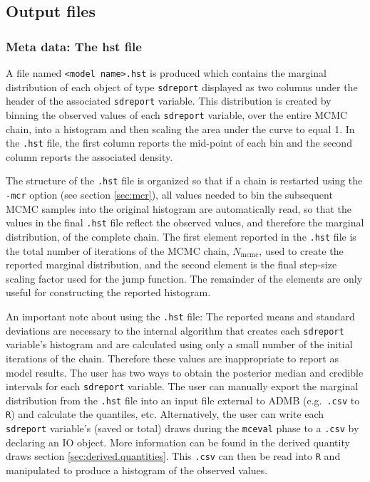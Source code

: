 \documentclass{article}\usepackage[]{graphicx}\usepackage[]{color}
\begin{document}
\subsection{Output files}\label{sec:outfiles}
\subsubsection{Meta data: The hst file}
A file named \texttt{<model name>.hst} is produced which
contains the marginal distribution of each object of type
\texttt{sdreport} displayed as two columns under the header
of the associated \texttt{sdreport} variable.  This
distribution is created by binning the observed values of
each \texttt{sdreport} variable, over the entire MCMC chain,
into a histogram and then scaling the area under the curve
to equal 1. In the \texttt{.hst} file, the first column
reports the mid-point of each bin and the second column
reports the associated density.

The structure of the \texttt{.hst} file is organized so that
if a chain is restarted using the \texttt{-mcr} option (see
section \ref{sec:mcr}), all values needed to bin the
subsequent MCMC samples into the original histogram are
automatically read, so that the values in the final
\texttt{.hst} file reflect the observed values, and
therefore the marginal distribution, of the complete
chain. The first element reported in the \texttt{.hst} file
is the total number of iterations of the MCMC chain,
$N_\text{mcmc}$, used to create the reported marginal
  distribution, and the second element is the final
  step-size scaling factor used for the jump function. The
  remainder of the elements are only useful for constructing
the reported histogram.

An important note about using the \texttt{.hst} file: The
reported means and standard deviations are necessary to the
internal algorithm that creates each \texttt{sdreport}
variable's histogram and are calculated using only a small
number of the initial iterations of the chain. Therefore
these values are inappropriate to report as model results.
The user has two ways to obtain the posterior median and
credible intervals for each \texttt{sdreport} variable.  The
user can manually export the marginal distribution from the
\texttt{.hst} file into an input file external to ADMB
(e.g.\ \texttt{.csv} to \texttt{R}) and calculate the
quantiles, etc. Alternatively, the user can write each
\texttt{sdreport} variable's (saved or total) draws during
the \texttt{mceval} phase to a \texttt{.csv} by declaring an
IO object. More information can be found in the derived
quantity draws section \ref{sec:derived.quantities}. This
\texttt{.csv} can then be read into \texttt{R} and
manipulated to produce a histogram of the observed values.
\end{document}

